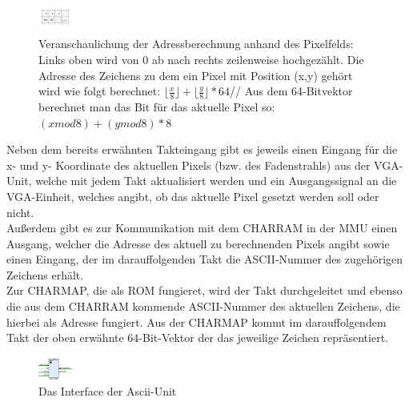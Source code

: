 \begin{figure}[H]
	\centering
		\includegraphics[width=0.1\textwidth]{Bildschirm.pdf}
	\caption{Veranschaulichung der Adressberechnung anhand des Pixelfelds: Links oben wird von 0 ab nach rechts zeilenweise hochgezählt. Die Adresse des Zeichens zu dem ein Pixel mit Position (x,y) gehört wird wie folgt berechnet: $\lfloor \frac{x}{8} \rfloor + \lfloor \frac{y}{8} \rfloor * 64$// Aus dem 64-Bitvektor berechnet man das Bit für das aktuelle Pixel so: $(x mod 8) + (y mod 8) * 8$}
	\label{fig:pixels}
\end{figure}


Neben dem bereits erw\"ahnten Takteingang gibt es jeweils einen Eingang f\"ur die x- und y- Koordinate des aktuellen Pixels (bzw. des Fadenstrahls) aus der VGA-Unit, welche mit jedem Takt aktualisiert werden und ein Ausgangssignal an die VGA-Einheit, welches angibt, ob das aktuelle Pixel gesetzt werden soll oder nicht.\\ Au{\ss}erdem gibt es zur Kommunikation mit dem CHARRAM in der MMU einen Ausgang, welcher die Adresse des aktuell zu berechnenden Pixels angibt sowie einen Eingang, der im darauffolgenden Takt die ASCII-Nummer des zugeh\"origen Zeichens erh\"alt.\\
Zur CHARMAP, die als ROM fungieret, wird der Takt durchgeleitet und ebenso die aus dem CHARRAM kommende ASCII-Nummer des aktuellen Zeichens, die hierbei als Adresse fungiert. Aus der CHARMAP kommt im darauffolgendem Takt der oben erw\"ahnte 64-Bit-Vektor der das jeweilige Zeichen repr\"asentiert.

\begin{figure}[H]
	\centering
		\includegraphics[width=0.1\textwidth]{Asciiunit.png}
	\caption{Das Interface der Ascii-Unit}
	\label{fig:interface}
\end{figure}

